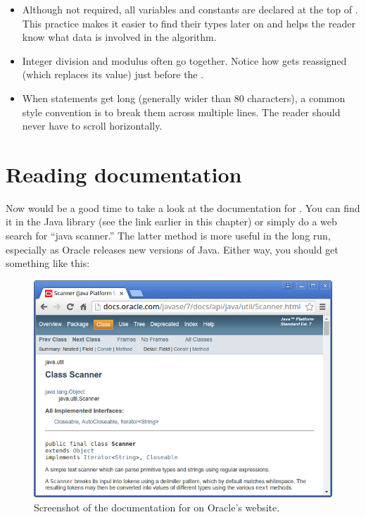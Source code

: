 \begin{itemize}

\item Although not required, all variables and constants are declared at the top of .
This practice makes it easier to find their types later on and helps the reader know what data is involved in the algorithm.

\item Integer division and modulus often go together.
Notice how  gets reassigned (which replaces its value) just before the .

\item When statements get long (generally wider than 80 characters), a common style convention is to break them across multiple lines.
The reader should never have to scroll horizontally.

\end{itemize}



\section{Reading documentation}
\label{sec:apidocs}


Now would be a good time to take a look at the documentation for .
You can find it in the Java library (see the link earlier in this chapter) or simply do a web search for ``java scanner.''
The latter method is more useful in the long run, especially as Oracle releases new versions of Java.
Either way, you should get something like this:

\begin{figure}[!h]
\includegraphics[width=\textwidth]{scanner.png}
\caption{Screenshot of the documentation for  on Oracle's website.}
\end{figure}

